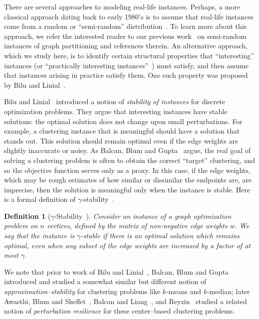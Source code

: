 \documentclass[twoside,leqno,twocolumn]{article}
\newtheorem{Definition}[theorem]{Definition}
\begin{document}
There are several approaches to modeling real-life instances. Perhaps, a more classical approach dating back
to early 1980's is to assume that real-life instances come from a random or ``semi-random'' distribution~\cite{BS,FKra,FK,KMM,MMV1,MMV2}. To learn more about this approach,
we refer the interested reader to our previous work~\cite{MMV1} on semi-random instances of graph partitioning and references therein.
An alternative approach, which we study here, is to identify certain structural properties that
``interesting'' instances (or ``practically interesting instances''~\cite{BDLS}) must satisfy, and then assume that instances arising in practice 
satisfy them. One such
property was proposed by Bilu and Linial~\cite{BL}.

Bilu and Linial~\cite{BL} introduced a notion of {\em stability of instances} for discrete optimization problems. They argue that interesting instances have stable solutions: the optimal solution does not change upon small perturbations. For example, a clustering instance that is meaningful should have a solution that stands out. This solution should remain optimal even if the edge weights are slightly inaccurate or noisy.
As Balcan, Blum and Gupta~\cite{BBG} argue, the real goal of solving a clustering problem is often to obtain the correct ``target''
clustering, and so the objective function serves only as a proxy. In this case, if the edge weights, which may be rough estimates of how similar or dissimilar the endpoints are, are imprecise, then the solution is meaningful only when the instance is stable. 
Here is a formal definition of $\gamma$-stability~\cite{BL}.

\begin{Definition}[$\gamma$-Stability~\cite{BL}]
Consider an instance of a graph optimization problem on $n$ vertices, defined by the matrix of non-negative edge weights $w$. We say that the instance is $\gamma$-stable if there is an optimal solution which remains optimal, even when any subset of the edge weights are increased by a factor of at most $\gamma$. 
\end{Definition} 

We note that prior to work of Bilu and Linial~\cite{BL}, Balcan, Blum and Gupta~\cite{BBG} introduced and studied a somewhat 
similar but different notion of \textit{approximation--stability} for clustering problems like $k$-means and $k$-median;
later Awasthi, Blum and Sheffet~\cite{Awasthietal}, Balcan and Liang~\cite{BalcanL}, and Reyzin~\cite{Rey} studied a related notion of \textit{perturbation resilience} for these center--based clustering problems.
 
\end{document}
